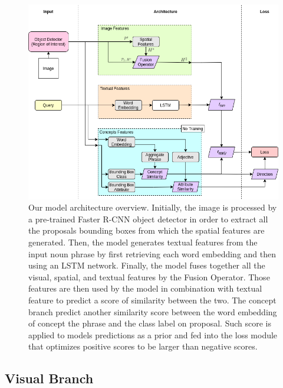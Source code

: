 \begin{figure}
  \centering
  \includegraphics[width=1.0\textwidth]{figures/model-architecture.png}
  \caption[Model architecture overview]{ Our model architecture
    overview. Initially, the image is processed by a pre-trained
    Faster R-CNN object detector in order to extract all the proposals
    bounding boxes from which the spatial features are generated.
    Then, the model generates textual features from the input noun
    phrase by first retrieving each word embedding and then using an
    LSTM network. Finally, the model fuses together all the visual,
    spatial, and textual features by the Fusion Operator. Those
    features are then used by the model in combination with textual
    feature to predict a score of similarity between the two. The
    concept branch predict another similarity score between the word
    embedding of concept the phrase and the class label on proposal.
    Such score is applied to models predictions as a prior and fed
    into the loss module that optimizes positive scores to be larger
    than negative scores. }
  \label{fig:model-architecture}
\end{figure}

\subsection{Visual Branch}
\label{subsec:visual-branch}

